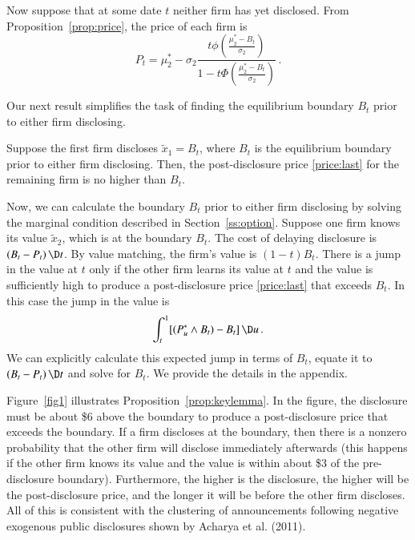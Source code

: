 \documentclass[authoryear,letterpaper,english,12pt]{elsarticle}
\begin{document}
Now suppose that at some date $t$ neither firm has yet disclosed.  From Proposition~\ref{prop:price}, the price of each firm is
\begin{equation}
    P_t = \mu^*_2 - \sigma_2 \frac{t \phi\left(\frac{\mu^*_2 - B_t}{\sigma_2}\right)}
    {1 - t \Phi\left(\frac{\mu^*_2 - B_t}{\sigma_2}\right)}\,.
\end{equation}

Our next result simplifies the task of finding the equilibrium boundary $B_t$ prior to either firm disclosing.

\begin{proposition}\label{prop:keylemma}
Suppose the first firm discloses $\tilde x_1 = B_t$, where $B_t$ is the equilibrium boundary prior to either firm disclosing.  Then, the post-disclosure price \eqref{price:last} for the remaining firm is no higher than $B_t$.
\end{proposition}

Now, we can calculate the boundary $B_t$ prior to either firm disclosing by solving the marginal condition described in Section~\ref{ss:option}. 
Suppose one firm knows its value $\tilde x_2$, which is at the boundary $B_t$.  The cost of delaying disclosure is $(B_t-P_t)\,\D t$.  By value matching, the firm's value is $(1-t)B_t$.  There is a jump in the value at $t$ only if the other firm learns its value at $t$ and the value is sufficiently high to produce a post-disclosure price \eqref{price:last} that exceeds $B_t$.  In this case the jump in the value is
\begin{equation}
    \int_t^1 [(P^*_u \wedge B_t) - B_t]\,\D u\,.
\end{equation}
We can explicitly calculate this expected jump in terms of $B_t$, equate it to $(B_t-P_t)\,\D t$ and solve for $B_t$.  We provide the details in the appendix.

Figure~\ref{fig1} illustrates Proposition~\ref{prop:keylemma}.  In the figure, the disclosure must be about \$6 above the boundary to produce a post-disclosure price that exceeds the boundary.  If a firm discloses at the boundary, then there is a nonzero probability that the other firm will disclose immediately afterwards (this happens if the other firm knows its value and the value is within about \$3 of the pre-disclosure boundary).  Furthermore, the higher is the disclosure, the higher will be the post-disclosure price, and the longer it will be before the other firm discloses.  All of this is consistent with the clustering of announcements following negative exogenous public disclosures shown by Acharya et al. (2011). 
\end{document}
